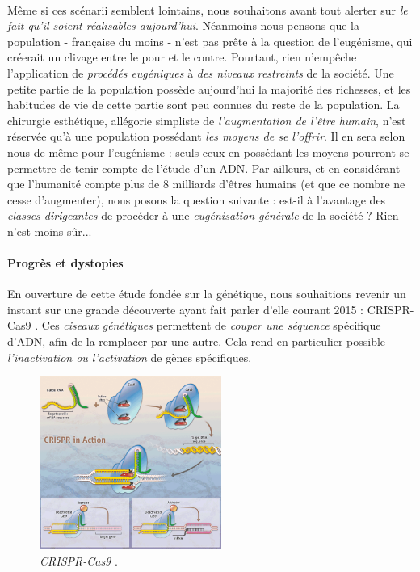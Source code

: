 \paragraph{} Même si ces scénarii semblent lointains, nous souhaitons avant tout alerter sur \emph{le fait
qu'il soient réalisables aujourd'hui}. Néanmoins nous pensons que la population - française du moins - n'est
pas prête à la question de l'eugénisme, qui créerait un clivage entre le pour et le contre. Pourtant, rien
n'empêche l'application de \emph{procédés eugéniques} à \emph{des niveaux restreints} de la société. Une
petite partie de la population possède aujourd'hui la majorité des richesses, et les habitudes de vie de
cette partie sont peu connues du reste de la population. La chirurgie esthétique, allégorie simpliste de
\emph{l'augmentation de l'être humain}, n'est réservée qu'à une population possédant \emph{les moyens de se
l'offrir}. Il en sera selon nous de même pour l'eugénisme : seuls ceux en possédant les moyens pourront se
permettre de tenir compte de l'étude d'un ADN. Par ailleurs, et en considérant que l'humanité compte plus
de 8 milliards d'êtres humains (et que ce nombre ne cesse d'augmenter), nous posons la question suivante :
est-il à l'avantage des \emph{classes dirigeantes} de procéder à une \emph{eugénisation générale} de
la société ? Rien n'est moins sûr...

\paragraph{Progrès et dystopies} En ouverture de cette étude fondée sur la génétique, nous souhaitions revenir
un instant sur une grande découverte ayant fait parler d'elle courant 2015 : CRISPR-Cas9 \cite{Genetique0}. Ces
\emph{ciseaux génétiques} permettent de \emph{couper une séquence} spécifique d'ADN, afin de la remplacer par
une autre. Cela rend en particulier possible \emph{l'inactivation ou l'activation} de gènes spécifiques.

\begin{figure}[ht]
    \centering
    \includegraphics[width=225px]{chapters/03/images/crispr.png}
    \caption{\label{crispr-cas9}\emph{CRISPR-Cas9} \cite{Genetique0}.}
\end{figure}

